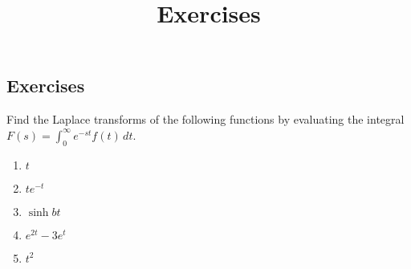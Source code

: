 \documentclass{ximera}
\title{Exercises} \license{CC BY-NC-SA 4.0}
\begin{document}
\begin{abstract}
\end{abstract}
\maketitle

\begin{onlineOnly}
\section*{Exercises}
\end{onlineOnly}


\begin{problem}\label{exer:8.1.1}
Find the Laplace transforms of the following functions by evaluating
the integral $F(s)=\int_0^\infty e^{-st} f(t)\,dt$.

\begin{enumerate}
    \item $t$
    \item $te^{-t}$ 
    \item $\sinh bt$
    \item $e^{2t}-3e^t$
    \item $t^2$
\end{enumerate}
\end{problem}
\end{document}
